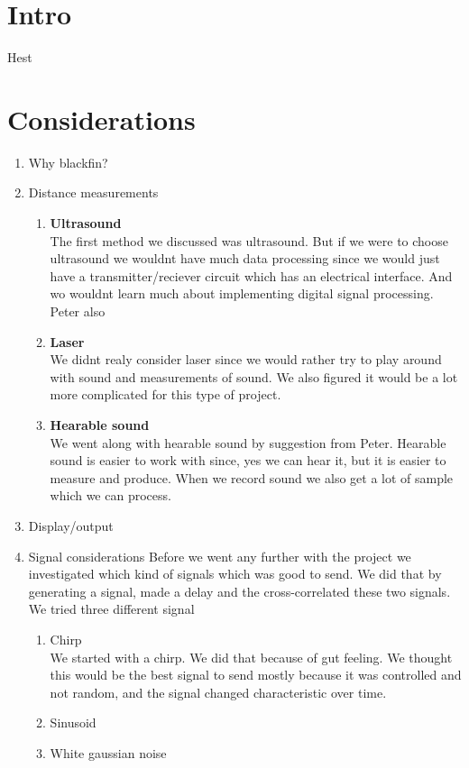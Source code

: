 \chapter{Intro}
Hest

\chapter{Considerations}
\begin{enumerate}
\item Why blackfin?
\item Distance measurements
\begin{enumerate}

\item \textbf{Ultrasound}\\
The first method we discussed was ultrasound. But if we were to choose ultrasound we wouldnt have much data processing since we would just have a transmitter/reciever circuit which has an electrical interface. And wo wouldnt learn much about implementing digital signal processing. Peter also 

\item \textbf{Laser}\\
We didnt realy consider laser since we would rather try to play around with sound and measurements of sound. We also figured it would be a lot more complicated for this type of project.

\item \textbf{Hearable sound}\\
We went along with hearable sound by suggestion from Peter. Hearable sound is easier to work with since, yes we can hear it, but it is easier to measure and produce. When we record sound we also get a lot of sample which we can process.

\end{enumerate}

\item Display/output
\item Signal considerations
Before we went any further with the project we investigated which kind of signals which was good to send. We did that by generating a signal, made a delay and the cross-correlated these two signals.
We tried three different signal
\begin{enumerate}
\item Chirp\\
We started with a chirp. We did that because of gut feeling. We thought this would be the best signal to send mostly because it was controlled and not random, and the signal changed characteristic over time.
\item Sinusoid
\item White gaussian noise
\end{enumerate}


\end{enumerate}

